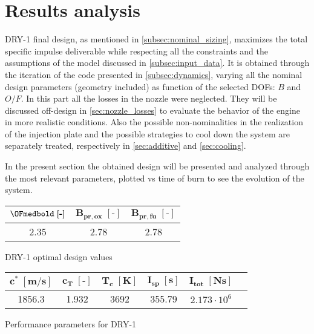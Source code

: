 \section{Results analysis}
\label{sec:results}

DRY-1 final design, as mentioned in \autoref{subsec:nominal_sizing}, maximizes the total specific impulse deliverable while respecting all the constraints and the assumptions of the model discussed in \autoref{subsec:input_data}.
It is obtained through the iteration of the code presented in \autoref{subsec:dynamics}, varying all the nominal design parameters (geometry included) as function of the selected DOFs: $B$ and $O/F$.
In this part all the losses in the nozzle were neglected. They will be discussed off-design in \autoref{sec:nozzle_losses} to evaluate the behavior of the engine in more realistic conditions.
Also the possible non-nominalities in the realization of the injection plate and the possible strategies to cool down the system are separately treated, respectively in \autoref{sec:additive} and \autoref{sec:cooling}.

In the present section the obtained design will be presented and analyzed through the most relevant parameters, plotted vs time of burn to see the evolution of the system.

\vspace*{5mm}

\begin{minipage}{0.5\linewidth}
    \centering
    \captionsetup{type=table}
    \renewcommand{\arraystretch}{1.4}
    \begin{tabular}{|c|c|c|}
        \hline
        $\OFmedbold \; \boldsymbol{[\textbf{-}]}$   &
        $\boldsymbol{B_{pr,ox} \; [\textbf{-}]}$    &
        $\boldsymbol{B_{pr,fu} \; [\textbf{-}]}$    \\
        \hline
        \hline
        2.35 & 2.78 & 2.78 \\
        \hline
    \end{tabular}
    \caption{DRY-1 optimal design values}
    \label{table:OF_B_final}
\end{minipage}\hfill
\begin{minipage}{0.5\linewidth}
    \centering
    \captionsetup{type=table}
    \renewcommand{\arraystretch}{1.4}
    \begin{tabular}{|c|c|c|c|c|c|}
        \hline
        $\boldsymbol{c^* \; [\textbf{m/s}]}$        &
        $\boldsymbol{c_T \; [\textbf{-}]}$          &
        $\boldsymbol{T_c \; [\textbf{K}]}$          &
        $\boldsymbol{I_{sp} \; [\textbf{s}]}$       &
        $\boldsymbol{I_{tot} \; [\textbf{Ns}]}$     \\
        \hline
        \hline
        1856.3 & 1.932 & 3692 & 355.79 & $2.173 \cdot 10^6$ \\
        \hline
    \end{tabular}
    \caption{Performance parameters for DRY-1}
    \label{table:performance_values}
\end{minipage} 

